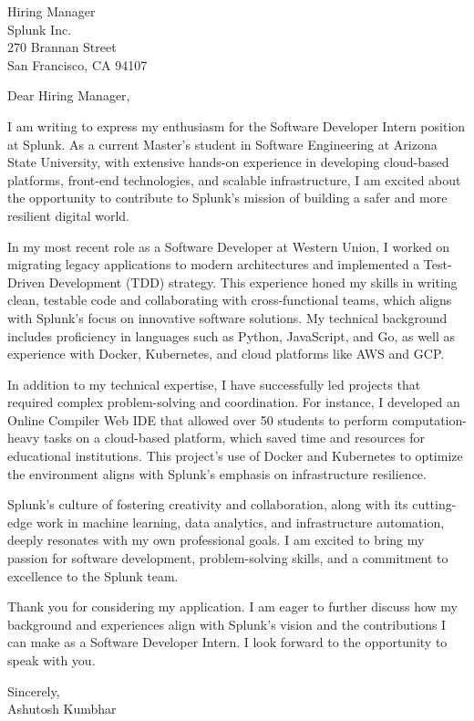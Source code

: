 \documentclass[a4paper,10pt]{letter}
\begin{document}
\begin{letter}{Hiring Manager \\ Splunk Inc. \\ 270 Brannan Street \\ San Francisco, CA 94107}

\opening{Dear Hiring Manager,}

I am writing to express my enthusiasm for the Software Developer Intern position at Splunk. As a current Master's student in Software Engineering at Arizona State University, with extensive hands-on experience in developing cloud-based platforms, front-end technologies, and scalable infrastructure, I am excited about the opportunity to contribute to Splunk’s mission of building a safer and more resilient digital world.

In my most recent role as a Software Developer at Western Union, I worked on migrating legacy applications to modern architectures and implemented a Test-Driven Development (TDD) strategy. This experience honed my skills in writing clean, testable code and collaborating with cross-functional teams, which aligns with Splunk’s focus on innovative software solutions. My technical background includes proficiency in languages such as Python, JavaScript, and Go, as well as experience with Docker, Kubernetes, and cloud platforms like AWS and GCP.

In addition to my technical expertise, I have successfully led projects that required complex problem-solving and coordination. For instance, I developed an Online Compiler Web IDE that allowed over 50 students to perform computation-heavy tasks on a cloud-based platform, which saved time and resources for educational institutions. This project’s use of Docker and Kubernetes to optimize the environment aligns with Splunk's emphasis on infrastructure resilience.

Splunk’s culture of fostering creativity and collaboration, along with its cutting-edge work in machine learning, data analytics, and infrastructure automation, deeply resonates with my own professional goals. I am excited to bring my passion for software development, problem-solving skills, and a commitment to excellence to the Splunk team.

Thank you for considering my application. I am eager to further discuss how my background and experiences align with Splunk’s vision and the contributions I can make as a Software Developer Intern. I look forward to the opportunity to speak with you.

\closing{Sincerely,\\ Ashutosh Kumbhar}

\end{letter}
\end{document}

